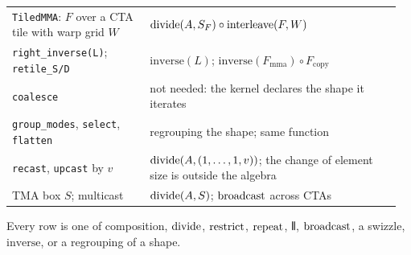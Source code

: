 \begin{center}
\begin{tabular}{@{}p{0.34\linewidth}p{0.62\linewidth}@{}}
\texttt{TiledMMA}: $F$ over a CTA tile with warp grid $W$ & $\mathrm{divide}(A, S_F) \circ \mathrm{interleave}(F, W)$ \\
\texttt{right\_inverse(L)}; \texttt{retile\_S/D} & $\mathrm{inverse}(L)$; $\mathrm{inverse}(F_{\mathrm{mma}}) \circ F_{\mathrm{copy}}$ \\
\texttt{coalesce} & not needed: the kernel declares the shape it iterates \\
\texttt{group\_modes}, \texttt{select}, \texttt{flatten} & regrouping the shape; same function \\
\texttt{recast}, \texttt{upcast} by $v$ & $\mathrm{divide}(A, (1,\dots,1,v))$; the change of element size is outside the algebra \\
TMA box $S$; multicast & $\mathrm{divide}(A, S)$; $\mathrm{broadcast}$ across CTAs \\
\bottomrule
\end{tabular}
\end{center}

Every row is one of composition, $\mathrm{divide}$, $\mathrm{restrict}$, $\mathrm{repeat}$,
$\interleave$, $\mathrm{broadcast}$, a swizzle, $\mathrm{inverse}$, or a regrouping of
a shape.
